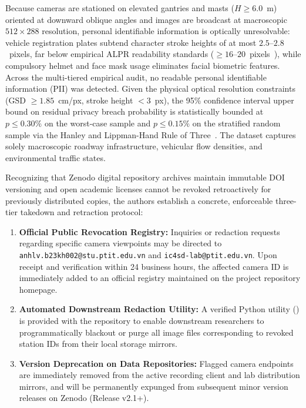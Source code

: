 \documentclass[preprint,12pt]{elsarticle}
\begin{document}
Because cameras are stationed on elevated gantries and masts ($H \ge 6.0$~m) oriented at downward oblique angles and images are broadcast at macroscopic $512 \times 288$ resolution, personal identifiable information is optically unresolvable: vehicle registration plates subtend character stroke heights of at most $2.5$--$2.8$~pixels, far below empirical ALPR readability standards ($\ge 16$--$20$~pixels~\cite{du2013automatic}), while compulsory helmet and face mask usage eliminates facial biometric features. Across the multi-tiered empirical audit, no readable personal identifiable information (PII) was detected. Given the physical optical resolution constraints (GSD $\ge 1.85$~cm/px, stroke height $<3$~px), the 95\% confidence interval upper bound on residual privacy breach probability is statistically bounded at $p \le 0.30\%$ on the worst-case sample and $p \le 0.15\%$ on the stratified random sample via the Hanley and Lippman-Hand Rule of Three~\cite{hanley1983if}. The dataset captures solely macroscopic roadway infrastructure, vehicular flow densities, and environmental traffic states.

Recognizing that Zenodo digital repository archives maintain immutable DOI versioning and open academic licenses cannot be revoked retroactively for previously distributed copies, the authors establish a concrete, enforceable three-tier takedown and retraction protocol:
\begin{enumerate}
    \item \textbf{Official Public Revocation Registry:} Inquiries or redaction requests regarding specific camera viewpoints may be directed to \texttt{anhlv.b23kh002@stu.ptit.edu.vn} and \texttt{ic4sd-lab@ptit.edu.vn}. Upon receipt and verification within 24 business hours, the affected camera ID is immediately added to an official  registry maintained on the project repository homepage.
    \item \textbf{Automated Downstream Redaction Utility:} A verified Python utility () is provided with the repository to enable downstream researchers to programmatically blackout or purge all image files corresponding to revoked station IDs from their local storage mirrors.
    \item \textbf{Version Deprecation on Data Repositories:} Flagged camera endpoints are immediately removed from the active recording client and lab distribution mirrors, and will be permanently expunged from subsequent minor version releases on Zenodo (Release v2.1+).
\end{enumerate}
\end{document}
